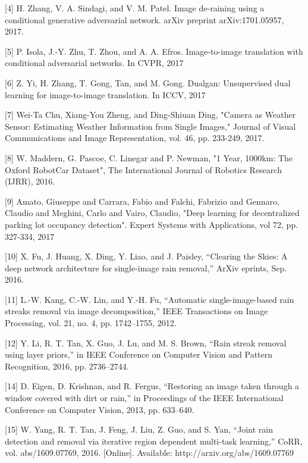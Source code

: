 \documentclass{article}
\begin{document}
\label{[4]}[4] H. Zhang, V. A. Sindagi, and V. M. Patel. Image de-raining using a conditional generative 
adversarial network. arXiv preprint arXiv:1701.05957, 2017.

\label{[5]}[5] P. Isola, J.-Y. Zhu, T. Zhou, and A. A. Efros. 
Image-to-image translation with conditional adversarial networks. 
In CVPR, 2017

\label{[6]}[6] Z. Yi, H. Zhang, T. Gong, Tan, and M. Gong. Dualgan: 
Unsupervised dual learning for image-to-image translation. 
In ICCV, 2017

\label{[7]}[7] Wei-Ta Chu, Xiang-You Zheng, and Ding-Shiuan Ding, "Camera as Weather Sensor: Estimating Weather Information from Single Images," Journal of Visual Communications and Image Representation, vol. 46, pp. 233-249, 2017.

\label{[8]}[8] W. Maddern, G. Pascoe, C. Linegar and P. Newman, "1 Year, 1000km: The Oxford RobotCar Dataset", The International Journal of Robotics Research (IJRR), 2016.

\label{[9]}[9] Amato, Giuseppe and Carrara, Fabio and Falchi, Fabrizio and Gennaro, Claudio and Meghini, Carlo and Vairo, Claudio, "Deep learning for decentralized parking lot occupancy detection". Expert Systems with Applications, vol 72, pp. 327-334, 2017

\label{[10]}[10] X. Fu, J. Huang, X. Ding, Y. Liao, and J. Paisley, “Clearing the Skies: A deep network architecture for single-image rain removal,” ArXiv eprints, Sep. 2016.

\label{[11]}[11] L.-W. Kang, C.-W. Lin, and Y.-H. Fu, “Automatic single-image-based rain streaks removal via image decomposition,” IEEE Transactions on Image Processing, vol. 21, no. 4, pp. 1742–1755, 2012.

\label{[12]}[12] Y. Li, R. T. Tan, X. Guo, J. Lu, and M. S. Brown, “Rain streak removal using layer priors,” in IEEE Conference on Computer Vision and Pattern Recognition, 2016, pp. 2736–2744.

\label{[14]}[14] D. Eigen, D. Krishnan, and R. Fergus, “Restoring an image taken through a window covered with dirt or rain,” in Proceedings of the IEEE International Conference on Computer Vision, 2013, pp. 633–640.

\label{[15]}[15] W. Yang, R. T. Tan, J. Feng, J. Liu, Z. Guo, and S. Yan, “Joint rain detection and removal via iterative region dependent multi-task learning,” CoRR, vol. abs/1609.07769, 2016. [Online]. Available: http://arxiv.org/abs/1609.07769
\end{document}
